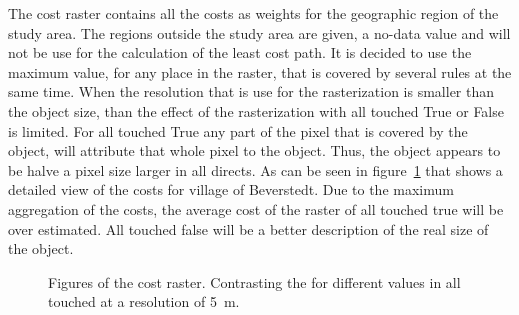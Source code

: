 \documentclass[acmtog]{acmart}
\begin{document}
	The cost raster contains all the costs as weights for the geographic region of the study area.
	The regions outside the study area are given, a no-data value and will not be use for the calculation of the least cost path.
	It is decided to use the maximum value, for any place in the raster, that is covered by several rules at the same time.
	When the resolution that is use for the rasterization is smaller than the object size, than the effect of the rasterization with all touched True or False is limited.
	For all touched True any part of the pixel that is covered by the object, will attribute that whole pixel to the object.
	Thus, the object appears to be halve a pixel size larger in all directs.
	As can be seen in figure~\ref{fig:costs_5m} that shows a detailed view of the costs for village of Beverstedt.
	Due to the maximum aggregation of the costs, the average cost of the raster of all touched true will be over estimated.
	All touched false will be a better description of the real size of the object.
	\begin{figure}
		\centering
		
		\qquad
		\caption{Figures of the cost raster. Contrasting the for different values in all touched at a resolution of 5~m.}
		\label{fig:costs_5m}
	\end{figure}
	
\end{document}
